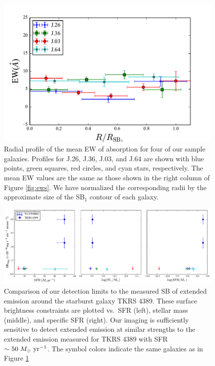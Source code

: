 \documentclass[twocolumn]{aastex62}
\def \msunperyr {{\; M_{\odot}\rm \;yr^{-1}}}
\begin{document}
\begin{figure}[!htb]
\centering
\includegraphics[scale=0.7]{ew_comb.pdf}
\caption{Radial profile of the mean EW of  absorption for four of our sample galaxies. Profiles for J.26,  J.36,  J.03, and J.64 are shown with blue points, green squares, red circles, and cyan stars, respectively. The mean EW values are the same as those shown in the right column of Figure \ref{fig:ews}. We have normalized the corresponding radii by the approximate size of the SB$_1$ contour of each galaxy.}
\label{fig:ew_comb}
\end{figure}

\begin{figure}[!htb]
\centering
\includegraphics[scale=0.57]{all_limitsv2.pdf}
\caption{Comparison of our detection limits to the measured SB of extended  emission around the starburst galaxy TKRS 4389. %
These surface brightness constraints are plotted vs.\ SFR (left), stellar mass (middle), and specific SFR (right).
Our imaging is sufficiently sensitive to detect extended emission at similar strengths to the extended emission measured for TKRS 4389 with SFR $\sim 50 \msunperyr$. The symbol colors indicate the same galaxies as in Figure \ref{fig:ew_comb}}
\label{fig:all_limits}
\end{figure}
\end{document}
